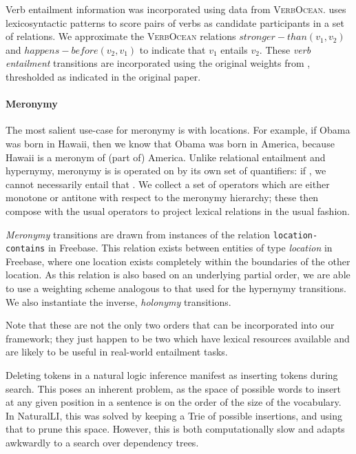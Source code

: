 Verb entailment information was incorporated using data from \textsc{VerbOcean}.
 uses lexicosyntactic patterns to score pairs of verbs as candidate participants in a set of relations.
We approximate the \textsc{VerbOcean} relations $\mathit{stronger-than}(v_1,v_2)$ and $\mathit{happens-before}(v_2,v_1)$ to indicate that $v_1$ entails $v_2$.
These \textit{verb entailment} transitions are incorporated using the original weights from , thresholded as indicated in the original paper. 

\paragraph{Meronymy}
The most salient use-case for meronymy is with locations.
For example, if Obama was born in Hawaii, then we know that Obama was born in
  America, because Hawaii is a meronym of (part of) America.
Unlike relational entailment and hypernymy, meronymy is is operated on by its own
  set of quantifiers:
  if , we cannot necessarily entail that .
We collect a set of operators which are either monotone or antitone with respect
  to the meronymy hierarchy; these then compose with the usual operators to project
  lexical relations in the usual fashion.

\textit{Meronymy} transitions are drawn from instances of the relation \texttt{location-contains} in Freebase\cite{key:2008bollacker-freebase}.
This relation exists between entities of type \textit{location} in Freebase, where one location exists completely within the boundaries of the other location.
As this relation is also based on an underlying partial order, we are able to use a weighting scheme analogous to that used for the hypernymy transitions.
We also instantiate the inverse, \textit{holonymy} transitions.

Note that these are not the only two orders that can be incorporated into our
  framework; they just happen to be two which have lexical resources available
  and are likely to be useful in real-world entailment tasks.

%
%
Deleting tokens in a natural logic inference manifest as inserting tokens
  during search.
This poses an inherent problem, as the space of possible words to insert at any
  given position in a sentence is on the order of the size of the vocabulary.
In NaturalLI, this was solved by keeping a Trie of possible insertions, and
  using that to prune this space.
However, this is both computationally slow and adapts awkwardly to a search over
  dependency trees.

